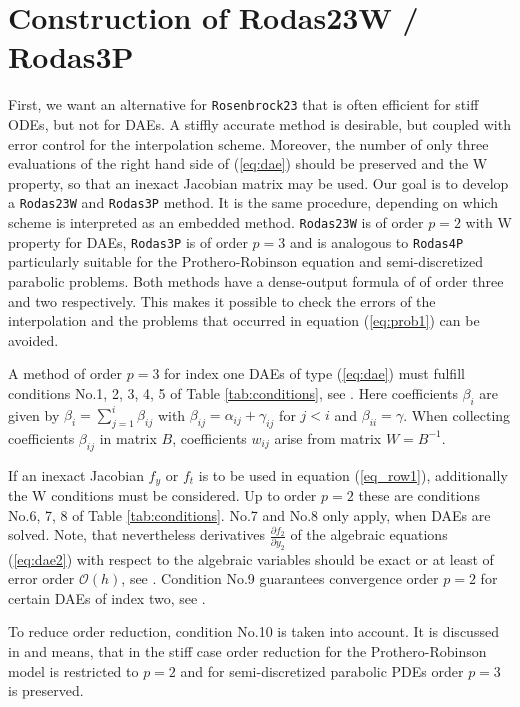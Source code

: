 \documentclass{juliacon}
\begin{document}
\section{Construction of Rodas23W / Rodas3P} \label{sec:construct}
First, we want an alternative for \verb|Rosenbrock23| that is often efficient for stiff ODEs, but not for DAEs.
A stiffly accurate method is desirable, but coupled with error control for the interpolation scheme. 
Moreover, the number of only three evaluations of the right hand side of (\ref{eq:dae}) should be preserved and the 
W property, so that an inexact Jacobian matrix may be used.
Our goal is to develop a \verb|Rodas23W| and \verb|Rodas3P| method. It is the same procedure, depending on which 
scheme is interpreted as an embedded method. 
\verb|Rodas23W| is of order $p=2$ with W property for DAEs, \verb|Rodas3P| is of order $p=3$ and is analogous 
to \verb|Rodas4P| particularly 
suitable for the Prothero-Robinson equation and semi-discretized parabolic problems.
Both methods have a dense-output formula of of order three and two respectively. This makes it possible to check the errors of the 
interpolation and the problems that occurred in equation (\ref{eq:prob1}) can be avoided.

A method of order $p=3$ for index one DAEs of type (\ref{eq:dae}) must fulfill conditions No.1, 2, 3, 4, 5 of Table \ref{tab:conditions}, see \cite{hairer,roche}.
Here coefficients $\beta_{i}$ are given by $\beta_i = \sum_{j=1}^i \beta_{i j}$ with
$\beta_{i j}= \alpha_{i j} + \gamma_{i j}$ for $j < i$ and $\beta_{i i} = \gamma$.
When collecting coefficients $\beta_{ij}$ in matrix $B$, coefficients $w_{ij}$ arise from matrix $W = B^{-1}$.

If an inexact Jacobian $f_y$ or $f_t$ is to be used in equation (\ref{eq_row1}), additionally the W conditions must be considered.
Up to order $p=2$ these are conditions No.6, 7, 8 of Table  \ref{tab:conditions}.
No.7 and No.8 only apply, when DAEs are solved. Note, that nevertheless derivatives $\frac{\partial f_2}{\partial y_2}$ of the algebraic equations (\ref{eq:dae2}) with respect to the 
algebraic variables should be exact
or at least of error order $\mathcal{O}(h)$, see \cite{jax2}.
Condition No.9 guarantees convergence order $p=2$ for certain DAEs of index two, see \cite{lubich}.

To reduce order reduction, condition No.10 is taken into account. It is discussed in \cite{scholz,rodas5p} and
means, that in the stiff case order reduction for the Prothero-Robinson model is restricted to $p=2$ and for semi-discretized parabolic PDEs
order $p=3$ is preserved.
\end{document}
